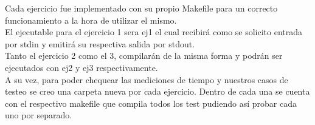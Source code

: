 Cada ejercicio fue implementado con su propio Makefile para un correcto funcionamiento a la hora de utilizar el mismo.\\
El ejecutable para el ejercicio 1 sera ej1 el cual recibir\'a como se solicito entrada por stdin y emitir\'a su respectiva salida por stdout.\\
Tanto el ejercicio 2 como el 3, compilar\'an de la misma forma y podr\'an ser ejecutados con ej2 y ej3 respectivamente.\\
A su vez, para poder chequear las mediciones de tiempo y nuestros casos de testeo se creo una carpeta nueva por cada ejercicio. Dentro de cada una se cuenta con el respectivo makefile que compila todos los test pudiendo as\'i probar cada uno por separado.